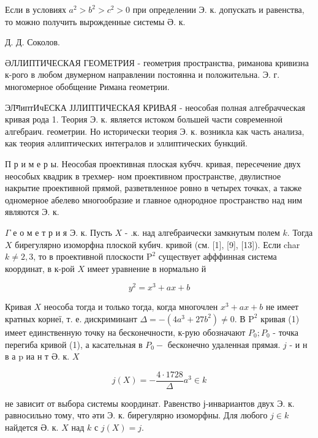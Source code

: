 \documentclass[10pt]{article}
\begin{document}
Если в условиях $a^{2}>b^{2}>c^{2}>0$ при определении Э. к. допускать и равенства, то можно получить вырожденные системы Ә. к.



Д. Д. Соколов.



ӘЛЛИПТИЧЕСКАЯ ГЕОМЕТРИЯ - геометрия пространства, риманова кривизна к-рого в любом двумерном направлении постоянна и положительна. Э. г. многомерное обобщение Римана геометрии.



ЭЛगиптИчЕСКА ЈЈЛИПТИЧЕСКАЯ КРИВАЯ - неособая полная алгебрачческая кривая рода 1. Теория Э. к. является истоком большей части современноӥ алгебраич. геометрии. Но исторически теория Э. к. возникла как часть анализа, как теория әллиптических интегралов и эллиптических бункций.



П р и м е р ы. Неособая проективная плоская кубчч. кривая, пересечение двух неособых квадрик в трехмер- ном проективном пространстве, двулистное накрытие проективной прямой, разветвленное ровно в четырех точках, а также одномерное абелево многообразие и главное однородное пространство над ним являются Э. к.



$\Gamma$ е о м е т р и я Э. к. Пусть $X$ - .к. над алгебраически замкнутым полем $k$. Тогда $X$ бирегулярно изоморфна плоской кубич. кривой (см. [1], [9], [13]). Если char $k \neq 2,3$, то в проективной плоскости $\mathrm{P}^{2}$ существует афффинная система координат, в к-рой $X$ имеет уравнение в нормально й



\[

y^{2}=x^{3}+a x+b

\]



Кривая $X$ неособа тогда и только тогда, когда многочлен $x^{3}+a x+b$ не имеет кратных корнеї, т. е. дискриминант $\Delta=-\left(4 a^{3}+27 b^{2}\right) \neq 0$. В $\mathrm{P}^{2}$ кривая (1) имеет единственную точку на бесконечности, к-рую обозначают $P_{0} ; P_{0}$ - точка перегиба кривой (1), а касательная в $P_{0}-$ бесконечно удаленная прямая. $j$ - и н в а p иа н т Ә. к. $X$



\[

j(X)=-\frac{4 \cdot 1728}{\Delta} a^{3} \in k

\]



не зависит от выбора системы координат. Равенство ј-инвариантов двух Э. к. равносильно тому, что әти Э. к. бирегулярно изоморфны. Для любого $j \in k$ найдется Ә. к. $X$ над $k$ с $j(X)=j$.
\end{document}
